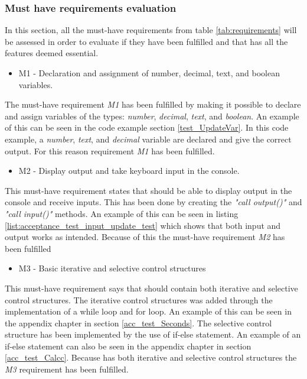 \subsubsection{Must have requirements evaluation}
In this section, all the must-have requirements from table \ref{tab:requirements} will be assessed in order to evaluate if they have been fulfilled and that \lang has all the features deemed essential.
\begin{itemize}
    \item M1 - Declaration and assignment of number, decimal, text, and boolean variables.
\end{itemize}
The must-have requirement \textit{M1} has been fulfilled by making it possible to declare and assign variables of the types: \textit{number}, \textit{decimal}, \textit{text}, and \textit{boolean}. An example of this can be seen in the code example section \ref{test_UpdateVar}. In this code example, a \textit{number}, \textit{text}, and \textit{decimal} variable are declared and give the correct output. For this reason requirement \textit{M1} has been fulfilled.
\\
\begin{itemize}
    \item M2 - Display output and take keyboard input in the console.
\end{itemize}
This must-have requirement states that \lang should be able to display output in the console and receive inputs. This has been done by creating the \textit{"call output()"} and \textit{"call input()"} methods. An example of this can be seen in listing \ref{list:acceptance_test_input_update_test} which shows that both input and output works as intended. Because of this the must-have requirement \textit{M2} has been fulfilled
\\
\begin{itemize}
    \item M3 - Basic iterative and selective control structures
\end{itemize}
This must-have requirement says that \lang should contain both iterative and selective control structures. The iterative control structures was added through the implementation of a while loop and for loop. An example of this can be seen in the appendix chapter in section \ref{acc_test_Seconds}. The selective control structure has been implemented by the use of if-else statement. An example of an if-else statement can also be seen in the appendix chapter in section \ref{acc_test_Calcc}. Because \lang has both iterative and selective control structures the \textit{M3} requirement has been fulfilled.\\


